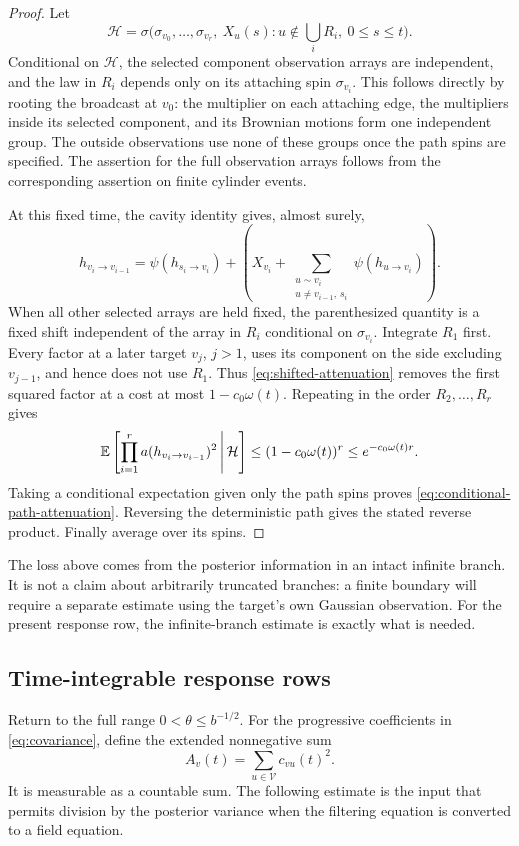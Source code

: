 \begin{proof}
Let
\[
 \mathcal H=\sigma\bigl(
   \sigma_{v_0},\ldots,\sigma_{v_r},\
   X_u(s):u\notin\textstyle\bigcup_iR_i,\ 0\le s\le t\bigr).
\]
Conditional on \(\mathcal H\), the selected
component observation arrays are independent, and the law in \(R_i\)
depends only on its attaching spin \(\sigma_{v_i}\).  This follows
directly by rooting the broadcast at \(v_0\): the multiplier on each
attaching edge, the multipliers inside its selected component, and its
Brownian motions form one independent group.  The outside observations
use none of these groups once the path spins are specified.
The assertion for the full
observation arrays follows from the corresponding assertion on finite
cylinder events.

At this fixed time, the cavity identity gives, almost surely,
\[
 h_{v_i\to v_{i-1}}
   =\psi(h_{s_i\to v_i})+
      \left(X_{v_i}
        +\sum_{\substack{u\sim v_i\\u\ne v_{i-1},\,s_i}}
                      \psi(h_{u\to v_i})\right).
\]
When all other selected arrays are held fixed, the parenthesized
quantity is a fixed shift independent of the array in \(R_i\)
conditional on \(\sigma_{v_i}\).  Integrate \(R_1\) first.
Every factor at a later target \(v_j\), \(j>1\), uses its component
on the side excluding \(v_{j-1}\), and hence does not use \(R_1\).
Thus \eqref{eq:shifted-attenuation} removes the first squared factor
at a cost at most \(1-c_0\omega(t)\).  Repeating in the order
\(R_2,\ldots,R_r\) gives
\[
 \mathbb E\left[\prod_{i=1}^r a(h_{v_i\to v_{i-1}})^2
       \,\middle|\,\mathcal H\right]
 \le (1-c_0\omega(t))^r
 \le e^{-c_0\omega(t)r}.
\]
Taking a conditional expectation given only the path spins proves
\eqref{eq:conditional-path-attenuation}.  Reversing the deterministic
path gives the stated reverse product.  Finally average over its spins.
\end{proof}

The loss above comes from the posterior information in an intact
infinite branch.  It is not a claim about arbitrarily truncated
branches: a finite boundary will require a separate estimate using
the target's own Gaussian observation.  For the present response row,
the infinite-branch estimate is exactly what is needed.

\subsection{Time-integrable response rows}

Return to the full range \(0<\theta\le b^{-1/2}\).  For the
progressive coefficients in \eqref{eq:covariance}, define the extended
nonnegative sum
\[
 A_v(t)=\sum_{u\in\mathcal V}c_{vu}(t)^2.
\]
It is measurable as a countable sum.  The following estimate is the
input that permits division by the posterior variance when the
filtering equation is converted to a field equation.


